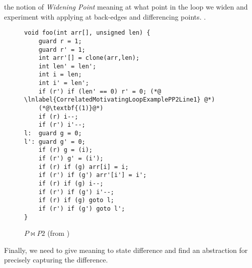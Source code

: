 the notion of \emph{Widening Point} meaning at what point in the loop we widen and experiment with applying at back-edges and differencing points. .

\begin{figure}
\centering
\lstset{numbers=left}
\begin{lstlisting}
void foo(int arr[], unsigned len) {
    guard r = 1;
    guard r' = 1;
    int arr'[] = clone(arr,len);
    int len' = len';
    int i = len;
    int i' = len';
    if (r') if (len' == 0) r' = 0; (*@ \lnlabel{CorrelatedMotivatingLoopExamplePP2Line1} @*)
    (*@\textbf{(1)}@*)
    if (r) i--;
    if (r') i'--;
l:  guard g = 0;
l': guard g' = 0;
    if (r) g = (i);
    if (r') g' = (i');
    if (r) if (g) arr[i] = i;
    if (r') if (g') arr'[i'] = i';
    if (r) if (g) i--;
    if (r') if (g') i'--;
    if (r) if (g) goto l;
    if (r') if (g') goto l';
}
\end{lstlisting}
\caption{$P \bowtie P2$ (from )}
\end{figure}

Finally, we need to give meaning to state difference and find an abstraction for precisely capturing the difference. 

